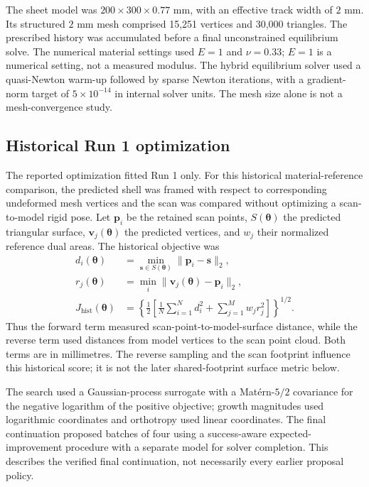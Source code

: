\documentclass[11pt]{article}
\begin{document}
The sheet model was $200\times300\times0.77$ mm, with an effective track width of $2$ mm. Its structured $2$ mm mesh comprised 15,251 vertices and 30,000 triangles. The prescribed history was accumulated before a final unconstrained equilibrium solve. The numerical material settings used $E=1$ and $\nu=0.33$; $E=1$ is a numerical setting, not a measured modulus. The hybrid equilibrium solver used a quasi-Newton warm-up followed by sparse Newton iterations, with a gradient-norm target of $5\times10^{-14}$ in internal solver units. The mesh size alone is not a mesh-convergence study.

\subsection{Historical Run 1 optimization}
The reported optimization fitted Run 1 only. For this historical material-reference comparison, the predicted shell was framed with respect to corresponding undeformed mesh vertices and the scan was compared without optimizing a scan-to-model rigid pose. Let $\mathbf p_i$ be the retained scan points, $S(\boldsymbol\theta)$ the predicted triangular surface, $\mathbf v_j(\boldsymbol\theta)$ the predicted vertices, and $w_j$ their normalized reference dual areas. The historical objective was
\begin{align}
 d_i(\boldsymbol\theta)&=\min_{\mathbf s\in S(\boldsymbol\theta)}\lVert\mathbf p_i-\mathbf s\rVert_2,\\
 r_j(\boldsymbol\theta)&=\min_i\lVert\mathbf v_j(\boldsymbol\theta)-\mathbf p_i\rVert_2,\\
 J_{\mathrm{hist}}(\boldsymbol\theta)&=\left\{\tfrac12\left[\frac{1}{N}\sum_{i=1}^{N}d_i^2+\sum_{j=1}^{M}w_jr_j^2\right]\right\}^{1/2}.
 \label{eq:historical-objective}
\end{align}
Thus the forward term measured scan-point-to-model-surface distance, while the reverse term used distances from model vertices to the scan point cloud. Both terms are in millimetres. The reverse sampling and the scan footprint influence this historical score; it is not the later shared-footprint surface metric below.

The search used a Gaussian-process surrogate with a Mat\'ern-$5/2$ covariance for the negative logarithm of the positive objective; growth magnitudes used logarithmic coordinates and orthotropy used linear coordinates. The final continuation proposed batches of four using a success-aware expected-improvement procedure with a separate model for solver completion. This describes the verified final continuation, not necessarily every earlier proposal policy.
\end{document}
